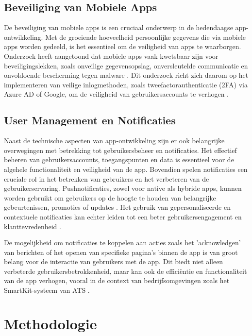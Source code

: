 \subsection{Beveiliging van Mobiele Apps}
\noindent De beveiliging van mobiele apps is een cruciaal onderwerp in de hedendaagse app-ontwikkeling. Met de groeiende hoeveelheid persoonlijke gegevens die via mobiele apps worden gedeeld, is het essentieel om de veiligheid van apps te waarborgen. Onderzoek heeft aangetoond dat mobiele apps vaak kwetsbaar zijn voor beveiligingslekken, zoals onveilige gegevensopslag, onversleutelde communicatie en onvoldoende bescherming tegen malware \autocite{}. Dit onderzoek richt zich daarom op het implementeren van veilige inlogmethoden, zoals tweefactorauthenticatie (2FA) via Azure AD of Google, om de veiligheid van gebruikersaccounts te verhogen \autocite{}.

\subsection{User Management en Notificaties}
\noindent Naast de technische aspecten van app-ontwikkeling zijn er ook belangrijke overwegingen met betrekking tot gebruikersbeheer en notificaties. Het effectief beheren van gebruikersaccounts, toegangspunten en data is essentieel voor de algehele functionaliteit en veiligheid van de app. Bovendien spelen notificaties een cruciale rol in het betrekken van gebruikers en het verbeteren van de gebruikerservaring. Pushnotificaties, zowel voor native als hybride apps, kunnen worden gebruikt om gebruikers op de hoogte te houden van belangrijke gebeurtenissen, promoties of updates \autocite{}. Het gebruik van gepersonaliseerde en contextuele notificaties kan echter leiden tot een beter gebruikersengagement en klanttevredenheid \autocite{}.

\noindent De mogelijkheid om notificaties te koppelen aan acties zoals het 'acknowledgen' van berichten of het openen van specifieke pagina's binnen de app is van groot belang voor de interactie van gebruikers met de app. Dit biedt niet alleen verbeterde gebruikersbetrokkenheid, maar kan ook de efficiëntie en functionaliteit van de app verhogen, vooral in de context van bedrijfsomgevingen zoals het SmartKit-systeem van ATS \autocite{}.


\section{Methodologie}
\label{sec:methodologie}

